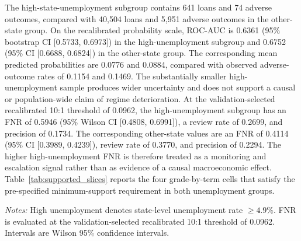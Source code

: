 \documentclass[10pt]{article}
\begin{document}
The high-state-unemployment subgroup contains 641 loans and 74 adverse outcomes, compared with 40,504 loans and 5,951 adverse outcomes in the other-state group. On the recalibrated probability scale, ROC-AUC is 0.6361 (95\% bootstrap CI [0.5733, 0.6973]) in the high-unemployment subgroup and 0.6752 (95\% CI [0.6688, 0.6824]) in the other-state group. The corresponding mean predicted probabilities are 0.0776 and 0.0884, compared with observed adverse-outcome rates of 0.1154 and 0.1469. The substantially smaller high-unemployment sample produces wider uncertainty and does not support a causal or population-wide claim of regime deterioration. At the validation-selected recalibrated 10:1 threshold of 0.0962, the high-unemployment subgroup has an FNR of 0.5946 (95\% Wilson CI [0.4808, 0.6991]), a review rate of 0.2699, and precision of 0.1734. The corresponding other-state values are an FNR of 0.4114 (95\% CI [0.3989, 0.4239]), review rate of 0.3770, and precision of 0.2294. The higher high-unemployment FNR is therefore treated as a monitoring and escalation signal rather than as evidence of a causal macroeconomic effect. Table~\ref{tab:supported_slices} reports the four grade-by-term cells that satisfy the pre-specified minimum-support requirement in both unemployment groups.

\begin{table}[!ht]
\centering
\caption{Sample-qualified grade-by-term diagnostics at the recalibrated 10:1 threshold. Cells are reported only when both unemployment groups contain at least 10 adverse outcomes and at least 10 non-events.}
\label{tab:supported_slices}

\vspace{3pt}
{\footnotesize \textit{Notes:} High unemployment denotes state-level unemployment rate $\geq4.9\%$. FNR is evaluated at the validation-selected recalibrated 10:1 threshold of 0.0962. Intervals are Wilson 95\% confidence intervals.}
\end{table}
\end{document}
